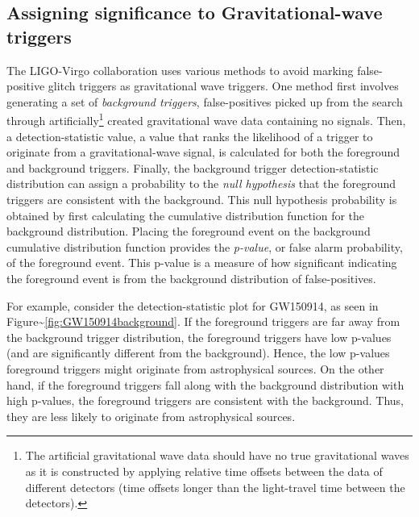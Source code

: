 \documentclass[%
 reprint,
 amsmath,amssymb,
 aps,
]{revtex4}
\begin{document}
\hypertarget{assigning-significance-to-gravitational-wave-triggers}{%
\subsection{Assigning significance to Gravitational-wave triggers}\label{assigning-significance-to-gravitational-wave-triggers}}

The LIGO-Virgo collaboration uses various methods to avoid marking false-positive glitch triggers as gravitational wave
triggers. One method first involves generating a set of \emph{background triggers}, false-positives picked up from the search
through artificially\footnote{The artificial gravitational wave data
  should have no true gravitational waves as it is constructed by applying relative time offsets between the data of different detectors (time offsets longer than the light-travel time between the detectors).} created gravitational
wave data containing no signals. Then, a detection-statistic value, a value
that ranks the likelihood of a trigger to originate from a gravitational-wave signal, is calculated for both the
foreground and background triggers. Finally, the background trigger detection-statistic distribution can assign a probability to the \emph{null hypothesis} that the foreground triggers are consistent with the background. This null hypothesis probability is obtained by first calculating the cumulative distribution function for the background distribution. Placing the foreground event on the background cumulative distribution function provides the \emph{p-value}, or false alarm probability, of the foreground event. This p-value is a measure of how significant indicating the foreground event is from the background distribution of false-positives.

For example, consider the
detection-statistic plot for GW150914, as seen in Figure\textasciitilde\ref{fig:GW150914background}. If the
foreground triggers are far away from the background trigger distribution, the foreground triggers have low p-values (and are significantly
different from the background). Hence, the low p-values foreground triggers might originate from astrophysical sources. On the other hand, if the foreground
triggers fall along with the background distribution with high p-values, the foreground triggers are consistent with the background. Thus,
they are less likely to originate from astrophysical sources.
\end{document}
